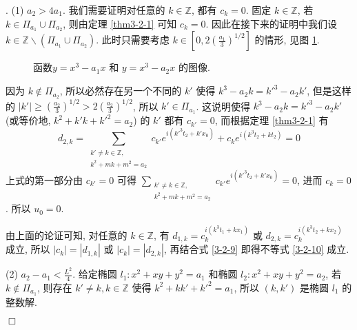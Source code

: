 \documentclass[master]{cugthesis}
\newcommand\Z{\ensuremath{\mathbb{Z}}}
\newenvironment{proof}{{\noindent\itshape 证明}.}{\hfill $\Box$\par}
\begin{document}
\begin{proof}
     (1) $a_2>4a_1$. 我们需要证明对任意的 $k\in\Z$, 都有 $c_k=0$. 固定 $k\in \Z$, 若 $k\in \Pi_{a_1}\cup \Pi_{a_2}$, 则由定理 \ref{thm3-2-1} 可知 $c_k=0$. 因此在接下来的证明中我们设 $k\in \Z \backslash \left(\Pi_{a_1}\cup \Pi_{a_2}\right)$. 此时只需要考虑 $k\in \left[0, 2\left(\frac{a_1}{3}\right)^{1 /2}\right]$ 的情形, 见图 \ref{fig6}.
          \begin{figure}[ht]
        \centering
        \caption{函数$y=x^3-a_1x$ 和 $y=x^3-a_2 x$ 的图像.}
        \label{fig6}
    \end{figure}
     因为 $k\notin \Pi_{a_2} $, 所以必然存在另一个不同的 $k'$ 使得 $k^3-a_2k={k'}^3-a_2k'$, 但是这样的 $|k'|\ge\left(\frac{a_2}{3}\right)^{1 /2}>2\left(\frac{a_2}{3}\right)^{1 /2}$, 所以 $k'\in \Pi_{a_1}$. 这说明使得 $k^3-a_2k=k'^3-a_2k'$ (或等价地, $k^2+k'k+k'^2=a_2$) 的 $k'$ 都有 $c_{k'}=0$, 而根据定理 \ref{thm3-2-1} 有
     \begin{equation*}
         d_{2,k}=\sum\limits_{\substack{k'\neq k\in \Z,\\ k^2+mk+m^2=a_2}} c_{k'}e^{i(k'^3t_2+k'x_0)}+c_k e^{i(k^3t_2+kt_2)}=0
     \end{equation*}
     上式的第一部分由 $c_{k'}=0$ 可得 $\sum_{\substack{k'\neq k\in \Z,\\ k^2+mk+m^2=a_2}} c_{k'}e^{i(k'^3t_2+k'x_0)}=0$, 进而 $c_k=0$. 所以 $u_0=0$.
  
  由上面的论证可知, 对任意的 $k\in \Z$, 有 $d_{1,k}=c_k^{i(k^3t_1+kx_1)}$ 或 $d_{2,k}=c_k^{i(k^3t_2+kx_2)}$ 成立, 所以 $|c_k|=|d_{1,k}|$ 或 $|c_k|=|d_{2,k}|$, 再结合式 \eqref{3-2-9} 即得不等式 \eqref{3-2-10} 成立.   
  
  (2) $a_2-a_1<\frac{L^2}{4}$. 给定椭圆 $l_1:x^2+xy+y^2=a_1$ 和椭圆 $l_2:x^2+xy+y^2=a_2$, 若 $k\notin \Pi_{a_1}$, 则存在 $k'\neq k,k\in \Z$ 使得 $k^2+kk'+k'^2=a_1$, 所以 $(k,k')$ 是椭圆 $l_1$ 的整数解.
  

\end{proof}
\end{document}

